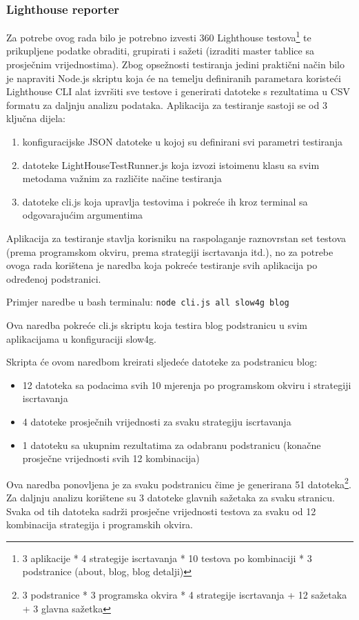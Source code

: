 \subsubsection{Lighthouse reporter}

Za potrebe ovog rada bilo je potrebno izvesti 360 Lighthouse testova\footnote{3 aplikacije * 4 strategije iscrtavanja * 10 testova po kombinaciji * 3 podstranice (about, blog, blog detalji)} te prikupljene podatke obraditi, grupirati i sažeti (izraditi master tablice sa prosječnim vrijednostima). Zbog opsežnosti testiranja jedini praktični način bilo je napraviti Node.js skriptu koja će na temelju definiranih parametara koristeći Lighthouse CLI alat izvršiti sve testove i generirati datoteke s rezultatima u CSV formatu za daljnju analizu podataka.
Aplikacija za testiranje sastoji se od 3 ključna dijela:
\begin{enumerate}
    \item konfiguracijske JSON datoteke u kojoj su definirani svi parametri testiranja
    \item datoteke LightHouseTestRunner.js koja izvozi istoimenu klasu sa svim metodama važnim za različite načine testiranja
    \item datoteke cli.js koja upravlja testovima i pokreće ih kroz terminal sa odgovarajućim argumentima
\end{enumerate}

Aplikacija za testiranje stavlja korisniku na raspolaganje raznovrstan set testova (prema programskom okviru, prema strategiji iscrtavanja itd.), no za potrebe ovoga rada korištena je naredba koja pokreće testiranje svih aplikacija po određenoj podstranici.

\bigskip

Primjer naredbe u bash terminalu:
\texttt{node cli.js all slow4g blog}

Ova naredba pokreće cli.js skriptu koja testira blog podstranicu u svim aplikacijama u konfiguraciji slow4g.

\bigskip
Skripta će ovom naredbom kreirati sljedeće datoteke za podstranicu blog:
\begin{itemize}
    \item 12 datoteka sa podacima svih 10 mjerenja po programskom okviru i strategiji iscrtavanja
    \item 4 datoteke prosječnih vrijednosti za svaku strategiju iscrtavanja
    \item 1 datoteku sa ukupnim rezultatima za odabranu podstranicu (konačne prosječne vrijednosti svih 12 kombinacija)
\end{itemize}
Ova naredba ponovljena je za svaku podstranicu čime je generirana 51 datoteka\footnote{3 podstranice * 3 programska okvira * 4 strategije iscrtavanja + 12 sažetaka + 3 glavna sažetka}.
Za daljnju analizu korištene su 3 datoteke glavnih sažetaka za svaku stranicu. Svaka od tih datoteka sadrži prosječne vrijednosti testova za svaku od 12 kombinacija strategija i programskih okvira.

